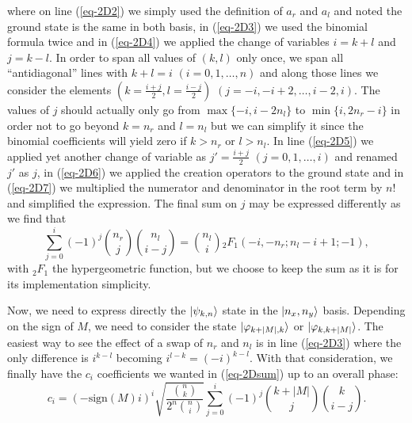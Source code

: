 where on line (\ref{eq-2D2}) we simply used the definition of $a_r$ and $a_l$ and noted the ground state is the same in both basis, in (\ref{eq-2D3}) we used the binomial formula twice and in (\ref{eq-2D4}) we applied the change of variables $i=k+l$ and $j=k-l$. In order to span all values of $(k,l)$ only once, we span all ``antidiagonal'' lines with $k+l=i$ $(i=0,1,\ldots,n)$ and along those lines we consider the elements $(k=\frac{i+j}{2},l=\frac{i-j}{2})$ $(j=-i, -i+2,\ldots, i-2,i)$. The values of $j$ should actually only go from $\max\{-i,i-2 n_l\}$ to  $\min\{i,2 n_r -i\}$ in order not to go beyond $k=n_r$ and $l=n_l$ but we can simplify it since the binomial coefficients will yield zero if $k>n_r$ or $l>n_l$. In line (\ref{eq-2D5}) we applied yet another change of variable as $j'=\frac{i+j}{2}$ $(j=0, 1, \ldots, i)$ and renamed $j'$ as $j$, in (\ref{eq-2D6}) we applied the creation operators to the ground state and in (\ref{eq-2D7}) we multiplied the numerator and denominator in the root term by $n!$ and simplified the expression. The final sum on $j$ may be expressed differently as we find that
\[  \sum_{j=0}^{i}(-1)^j \binom{n_r}{j} \binom{n_l}{i-j} = \binom{n_l}{i} {}_2F_1(-i,-n_r; n_l -i+1;-1), \]
with ${}_2F_1$ the hypergeometric function, but we choose to keep the sum as it is for its implementation simplicity.

Now,  we need to express directly the $| \psi_{k,n} \rangle$ state in the $| n_x, n_y \rangle$ basis. Depending on the sign of $M$, we need to consider the state $| \varphi_{k+|M|, k} \rangle$ or $| \varphi_{k,k+|M|} \rangle$. The easiest way to see the effect of a swap of $n_r$ and $n_l$ is in line (\ref{eq-2D3}) where the only difference is $i^{k-l}$  becoming $i^{l-k}=(-i)^{k-l}$. With that consideration, we finally have the $c_i$ coefficients we wanted in (\ref{eq-2Dsum}) up to an overall phase:
\[ c_i =  \left(- \textrm{sign}(M) i \right)^i  \sqrt{\frac{\binom{n}{k} }{2^n \binom{n}{i}}}    \sum_{j=0}^{i}(-1)^j \binom{k+|M|}{j} \binom{k}{i-j}.\]

